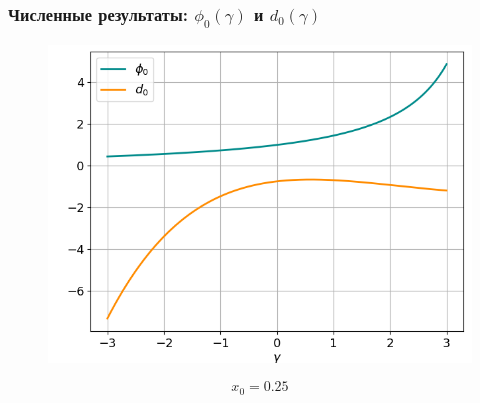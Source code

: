 \documentclass[fullscreen=true, unicode, bookmarks=false]{beamer}
\begin{document}
\begin{frame}
\frametitle{ Численные результаты: $ \phi_0(\gamma) $ и $ d_0(\gamma) $ }

\begin{figure} 
\includegraphics[scale=0.55]{divergent_phi0d0_0.png}  
\end{figure}

$$ x_0 = 0.25 $$

\end{frame}
\end{document}
